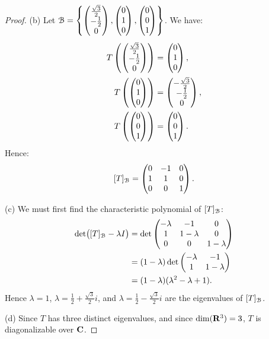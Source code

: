 \documentclass[10pt,twoside,openany]{memoir}
\begin{document}
{\begin{proof}
        (b) Let $\mathcal{B} = \left\{ \left( \begin{matrix} \frac{\sqrt{3}}{2} \\ -\frac{1}{2} \\ 0 \end{matrix} \right), \left( \begin{matrix} 0 \\ 1 \\ 0 \end{matrix} \right), \left( \begin{matrix} 0 \\ 0 \\ 1 \end{matrix} \right) \right\}$. We have:
            \begin{equation*}
            \begin{split}
                T \left( \left( \begin{matrix} \frac{\sqrt{3}}{2} \\ -\frac{1}{2} \\ 0 \end{matrix} \right) \right)
                & = \left( \begin{matrix} 0 \\ 1 \\ 0 \end{matrix} \right), \\
                T \left( \left( \begin{matrix} 0 \\ 1 \\ 0 \end{matrix} \right) \right)
                & = \left( \begin{matrix} -\frac{\sqrt{3}}{2} \\ -\frac{1}{2} \\ 0 \end{matrix} \right), \\
                T \left( \left( \begin{matrix} 0 \\ 0 \\ 1 \end{matrix} \right) \right)
                & = \left( \begin{matrix} 0 \\ 0 \\ 1 \end{matrix} \right).
            \end{split}
            \end{equation*}
        Hence:
            \begin{equation*}
            \begin{split}
                [T]_{\mathcal{B}} = 
                \left( \begin{matrix} 
                0 & -1 & 0 \\ 
                1 & 1 & 0 \\ 
                0 & 0 & 1 
                \end{matrix} \right).
            \end{split}
            \end{equation*}

        (c) We must first find the characteristic polynomial of $[T]_{\mathcal{B}}$:
            \begin{equation*}
            \begin{split}
                \det \bigl([T]_{\mathcal{B}} - \lambda I\bigr)
                & = \det \left( \begin{matrix} -\lambda & -1 & 0 \\ 1 & 1-\lambda & 0 \\ 0 & 0 & 1-\lambda \end{matrix} \right) \\
                & = (1-\lambda)\det \left( \begin{matrix} -\lambda & -1 \\ 1 & 1-\lambda \end{matrix} \right) \\
                & = (1-\lambda)(\lambda^2 - \lambda + 1). \\
            \end{split}
            \end{equation*}
        Hence $\lambda = 1$, $\lambda = \frac{1}{2} + \frac{\sqrt{3}}{2}i$, and $\lambda = \frac{1}{2} - \frac{\sqrt{3}}{2}i$ are the eigenvalues of $[T]_{\mathcal{B}}$.

        (d) Since $T$ has three distinct eigenvalues, and since $\dim(\mathbf{R}^3) = 3$, $T$ is diagonalizable over $\mathbf{C}$.

    \end{proof}}
\end{document}
